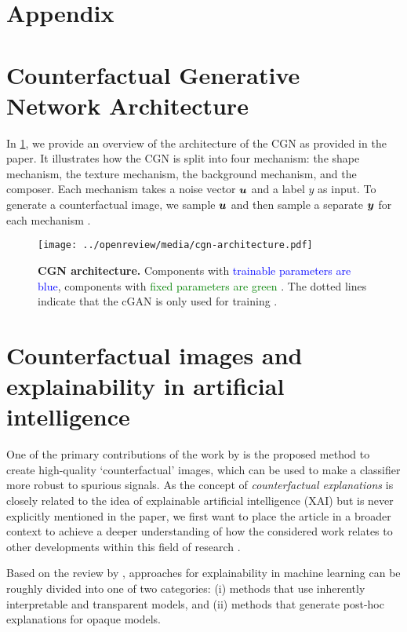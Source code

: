 \newpage

\appendix
\section*{Appendix}


\section{Counterfactual Generative Network Architecture} \label{sec:cgn-architecture}
In \cref{fig:cgn-architecture}, we provide an overview of the architecture of the CGN as provided in the paper. It illustrates how the CGN is split into four mechanism: the shape mechanism, the texture mechanism, the background mechanism, and the composer. Each mechanism takes a noise vector $\boldsymbol{u}$ and a label $y$ as input. To generate a counterfactual image, we sample $\boldsymbol{u}$ and then sample a separate $\boldsymbol{y}$ for each mechanism \citet{Sauer2021ICLR}.

\begin{figure}[H]
    \centering
    \texttt{[image: ../openreview/media/cgn-architecture.pdf]}
    \caption{\textbf{CGN architecture.} Components with \textcolor{Blue}{trainable parameters are blue}, components with \textcolor{Green}{fixed parameters are green} \cite{Sauer2021ICLR}. The dotted lines indicate that the cGAN is only used for training \cite{Sauer2021ICLR}.}
    \label{fig:cgn-architecture}
\end{figure}


\section{Counterfactual images and explainability in artificial intelligence} \label{sec:counterfactuals}
One of the primary contributions of the work by \citet{Sauer2021ICLR} is the proposed method to create high-quality `counterfactual' images, which can be used to make a classifier more robust to spurious signals. As the concept of \emph{counterfactual explanations} is closely related to the idea of explainable artificial intelligence (XAI) but is never explicitly mentioned in the paper, we first want to place the article in a broader context to achieve a deeper understanding of how the considered work relates to other developments within this field of research \cite{arrieta2020explainable}.

Based on the review by \citet{verma2020counterfactual}, approaches for explainability in machine learning can be roughly divided into one of two categories:
(i) methods that use inherently interpretable and transparent models, and (ii) methods that generate post-hoc explanations for opaque models.

